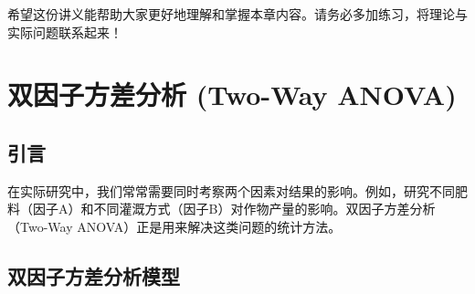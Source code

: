 \documentclass[12pt, a4paper]{amsart}
\begin{document}
希望这份讲义能帮助大家更好地理解和掌握本章内容。请务必多加练习，将理论与实际问题联系起来！

\section{双因子方差分析 (Two-Way ANOVA)}

\subsection{引言}
在实际研究中，我们常常需要同时考察两个因素对结果的影响。例如，研究不同肥料（因子A）和不同灌溉方式（因子B）对作物产量的影响。双因子方差分析（Two-Way ANOVA）正是用来解决这类问题的统计方法。

\subsection{双因子方差分析模型}
\end{document}
